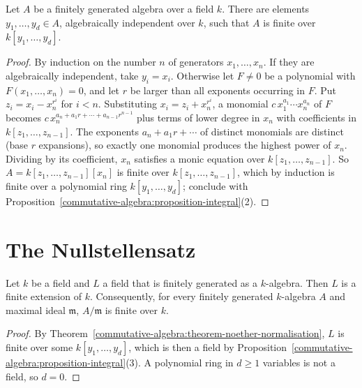 \begin{theorem}\label{commutative-algebra:theorem-noether-normalisation}
Let $A$ be a finitely generated algebra over a field $k$. There are elements $y_1, \ldots, y_d \in A$, algebraically
independent over $k$, such that $A$ is finite over $k[y_1, \ldots, y_d]$.
\end{theorem}

\begin{proof}
By induction on the number $n$ of generators $x_1, \ldots, x_n$. If they are algebraically independent, take $y_i = x_i$.
Otherwise let $F \neq 0$ be a polynomial with $F(x_1, \ldots, x_n) = 0$, and let $r$ be larger than all exponents occurring in
$F$. Put $z_i = x_i - x_n^{r^i}$ for $i < n$. Substituting $x_i = z_i + x_n^{r^i}$, a monomial
$c\,x_1^{a_1} \cdots x_n^{a_n}$ of $F$ becomes $c\,x_n^{a_n + a_1r + \cdots + a_{n-1}r^{n-1}}$ plus terms of lower degree in $x_n$
with coefficients in $k[z_1, \ldots, z_{n-1}]$. The exponents $a_n + a_1r + \cdots$ of distinct monomials are distinct (base $r$
expansions), so exactly one monomial produces the highest power of $x_n$. Dividing by its coefficient, $x_n$ satisfies a
monic equation over $k[z_1, \ldots, z_{n-1}]$. So $A = k[z_1, \ldots, z_{n-1}][x_n]$ is finite over
$k[z_1, \ldots, z_{n-1}]$, which by induction is finite over a polynomial ring $k[y_1, \ldots, y_d]$; conclude with
Proposition~\ref{commutative-algebra:proposition-integral}(2).
\end{proof}

\section{The Nullstellensatz}\label{commutative-algebra:section-nullstellensatz}

\begin{theorem}\label{commutative-algebra:theorem-zariski-lemma}
Let $k$ be a field and $L$ a field that is finitely generated as a $k$-algebra. Then $L$ is a finite extension of $k$.
Consequently, for every finitely generated $k$-algebra $A$ and maximal ideal $\mathfrak{m}$, $A/\mathfrak{m}$ is finite over $k$.
\end{theorem}

\begin{proof}
By Theorem~\ref{commutative-algebra:theorem-noether-normalisation}, $L$ is finite over some $k[y_1, \ldots, y_d]$, which is then a
field by Proposition~\ref{commutative-algebra:proposition-integral}(3). A polynomial ring in $d \geq 1$ variables is not a field,
so $d = 0$.
\end{proof}

